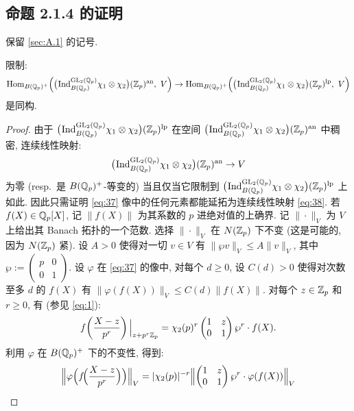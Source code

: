 \subsection{命题 2.1.4 的证明}

保留 \ref{sec:A.1} 的记号.

\begin{lemma}\label{lem:A.2.1}
限制:
\begin{equation}
\label{eq:37}
\operatorname{Hom}_{B(\mathbb{Q}_p)^{+}}\Bigl(\bigl(\prescript{}{}{\mathrm{Ind}}_{B(\mathbb{Q}_p)}^{\mathrm{GL}_2(\mathbb{Q}_p)} \chi_1 \otimes \chi_2\bigr)(\mathbb{Z}_p)^{\mathrm{an}},\ V\Bigr)
\to \operatorname{Hom}_{B(\mathbb{Q}_p)^{+}}\Bigl(\bigl(\prescript{}{}{\mathrm{Ind}}_{B(\mathbb{Q}_p)}^{\mathrm{GL}_2(\mathbb{Q}_p)} \chi_1 \otimes \chi_2\bigr)(\mathbb{Z}_p)^{\mathrm{lp}},\ V\Bigr)
\end{equation}
是同构.
\end{lemma}

\begin{proof}
由于 $\bigl(\prescript{}{}{\mathrm{Ind}}_{B(\mathbb{Q}_p)}^{\mathrm{GL}_2(\mathbb{Q}_p)} \chi_1 \otimes \chi_2\bigr)(\mathbb{Z}_p)^{\mathrm{lp}}$ 在空间 $\bigl(\prescript{}{}{\mathrm{Ind}}_{B(\mathbb{Q}_p)}^{\mathrm{GL}_2(\mathbb{Q}_p)} \chi_1 \otimes \chi_2\bigr)(\mathbb{Z}_p)^{\mathrm{an}}$ 中稠密, 连续线性映射:
\begin{equation}
\label{eq:38}
\bigl(\prescript{}{}{\mathrm{Ind}}_{B(\mathbb{Q}_p)}^{\mathrm{GL}_2(\mathbb{Q}_p)} \chi_1 \otimes \chi_2\bigr)(\mathbb{Z}_p)^{\mathrm{an}} \to V
\end{equation}
为零 (resp.\ 是 $B(\mathbb{Q}_p)^{+}$-等变的) 当且仅当它限制到 $\bigl(\prescript{}{}{\mathrm{Ind}}_{B(\mathbb{Q}_p)}^{\mathrm{GL}_2(\mathbb{Q}_p)} \chi_1 \otimes \chi_2\bigr)(\mathbb{Z}_p)^{\mathrm{lp}}$ 上如此.
因此只需证明 \eqref{eq:37} 像中的任何元素都能延拓为连续线性映射 \eqref{eq:38}.
若 $f(X) \in \mathbb{Q}_p[X]$, 记 $\|f(X)\|$ 为其系数的 $p$ 进绝对值的上确界.
记 $\|\cdot\|_V$ 为 $V$ 上给出其 Banach 拓扑的一个范数.
选择 $\|\cdot\|_V$ 在 $N(\mathbb{Z}_p)$ 下不变 (这是可能的, 因为 $N(\mathbb{Z}_p)$ 紧).
设 $A > 0$ 使得对一切 $v \in V$ 有 $\|\wp v\|_V \le A\|v\|_V$, 其中 $\wp := \begin{pmatrix} p & 0 \\ 0 & 1 \end{pmatrix}$.
设 $\varphi$ 在 \eqref{eq:37} 的像中, 对每个 $d \ge 0$, 设 $C(d) > 0$ 使得对次数至多 $d$ 的 $f(X)$ 有 $\|\varphi(f(X))\|_V \le C(d)\|f(X)\|$.
对每个 $z \in \mathbb{Z}_p$ 和 $r \ge 0$, 有 (参见 \eqref{eq:1}):
\[
f\!\left(\frac{X-z}{p^{r}}\right)\Big|_{z+p^{r}\mathbb{Z}_p}
= \chi_2(p)^{r}\begin{pmatrix} 1 & z \\ 0 & 1 \end{pmatrix}\wp^{r} \cdot f(X).
\]
利用 $\varphi$ 在 $B(\mathbb{Q}_p)^{+}$ 下的不变性, 得到:
\[
\Bigl\|\varphi\Bigl(f\!\Bigl(\frac{X-z}{p^{r}}\Bigr)\Bigr)\Bigr\|_V
= |\chi_2(p)|^{-r}\Bigl\|\begin{pmatrix} 1 & z \\ 0 & 1 \end{pmatrix}\wp^{r} \cdot \varphi(f(X))\Bigr\|_V
\]
\end{proof}
